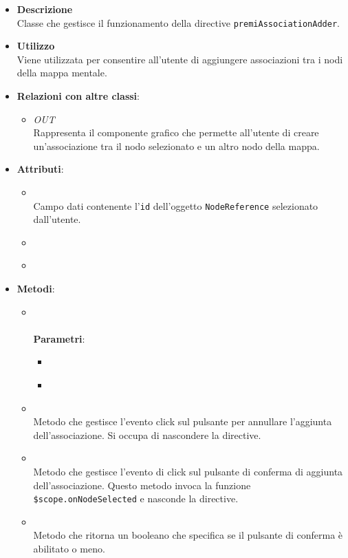 \begin{itemize}
\item \textbf{Descrizione}\\
Classe che gestisce il funzionamento della directive \texttt{premiAssociationAdder}.
\item \textbf{Utilizzo}\\
Viene utilizzata per consentire all'utente di aggiungere associazioni tra i nodi della mappa mentale.
\item \textbf{Relazioni con altre classi}:
\begin{itemize}
\item \textit{OUT} \hyperref[\nogloxy{Premi::Front-End::Directives::premiAssociationAdder}]{}\\
Rappresenta il componente grafico che permette all’utente di creare un'associazione tra il nodo selezionato e un altro nodo della mappa.
\end{itemize}
\item \textbf{Attributi}:
\begin{itemize}
\item {}
\\ Campo dati contenente l'\texttt{id} dell'oggetto \texttt{NodeReference} selezionato dall'utente.
\item {}
\\ \dpMDDialogServiceField
\item {}
\\ \dpScopeField
\end{itemize}
\item \textbf{Metodi}:
\begin{itemize}
\item {}
\\ \dpConstructor
\\ \textbf{Parametri}:
\begin{itemize}
\item {}
\\ \dpScopeParam
\item {}
\\ \dpMDDialogServiceField
\end{itemize}
\item {}
\\ Metodo che gestisce l'evento click sul pulsante per annullare l'aggiunta dell'associazione. Si occupa di nascondere la directive.
\item {}
\\ Metodo che gestisce l'evento di click sul pulsante di conferma di aggiunta dell'associazione. Questo metodo invoca la funzione \texttt{\$scope.onNodeSelected} e nasconde la directive.
\item {}
\\ Metodo che ritorna un booleano che specifica se il pulsante di conferma è abilitato o meno.
\end{itemize}
\end{itemize}
